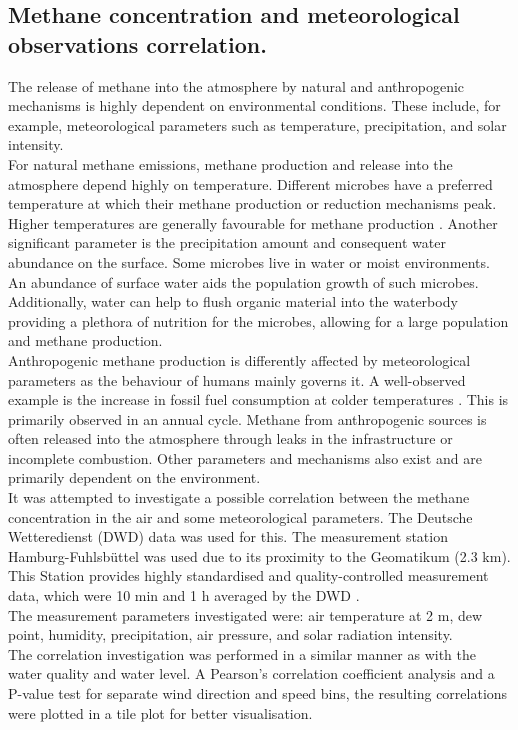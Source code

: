 \subsection{Methane concentration and meteorological observations correlation.}
The release of methane into the atmosphere by natural and anthropogenic mechanisms is highly dependent on environmental conditions. These include, for example, meteorological parameters such as temperature, precipitation, and solar intensity.\\
For natural methane emissions, methane production and release into the atmosphere depend highly on temperature. Different microbes have a preferred temperature at which their methane production or reduction mechanisms peak. Higher temperatures are generally favourable for methane production \cite{Singh.2000}. Another significant parameter is the precipitation amount and consequent water abundance on the surface. Some microbes live in water or moist environments. An abundance of surface water aids the population growth of such microbes. Additionally, water can help to flush organic material into the waterbody providing a plethora of nutrition for the microbes, allowing for a large population and methane production. \\
Anthropogenic methane production is differently affected by meteorological parameters as the behaviour of humans mainly governs it. A well-observed example is the increase in fossil fuel consumption at colder temperatures \cite{Javadinejad.2019}. This is primarily observed in an annual cycle. Methane from anthropogenic sources is often released into the atmosphere through leaks in the infrastructure or incomplete combustion. Other parameters and mechanisms also exist and are primarily dependent on the environment.\\
It was attempted to investigate a possible correlation between the methane concentration in the air and some meteorological parameters.  The Deutsche Wetteredienst (DWD) data was used for this. The measurement station Hamburg-Fuhlsbüttel was used due to its proximity to the Geomatikum (2.3 km). This Station provides highly standardised and quality-controlled measurement data, which were 10 min and 1 h averaged by the DWD \cite{Kaspar.2013}.\\
The measurement parameters investigated were: air temperature at 2 m, dew point, humidity, precipitation, air pressure, and solar radiation intensity.\\
The correlation investigation was performed in a similar manner as with the water quality and water level. A Pearson's correlation coefficient analysis and a P-value test for separate wind direction and speed bins, the resulting correlations were plotted in a tile plot for better visualisation.

